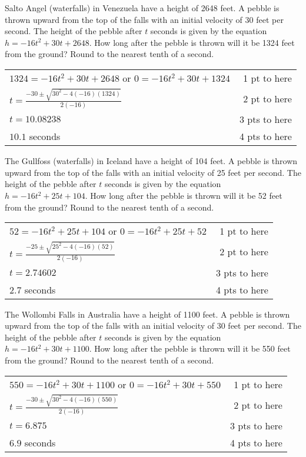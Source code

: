 {
	Salto Angel (waterfalls) in Venezuela have a height of 2648 feet. A pebble is thrown upward from the top of the falls with an initial velocity of 30 feet per second. The height of the pebble after $t$ seconds is given by the equation $h=-16t^2+30t+2648$. How long after the pebble is thrown will it be 1324 feet from the ground? Round to the nearest tenth of a second.
}
{
	\begin{tabular}{l r}
	$1324=-16t^2+30t+2648$ or $0=-16t^2+30t+1324$ & 1 pt to here\\
	$t=\frac{-30 \pm \sqrt{30^2-4(-16)(1324)}}{2(-16)}$ & 2 pt to here\\
	$t=10.08238$ &  3 pts to here\\
	$10.1$ seconds & 4 pts to here\\
	\end{tabular}
}

{
	The Gullfoss (waterfalls) in Iceland have a height of 104 feet. A pebble is thrown upward from the top of the falls with an initial velocity of 25 feet per second. The height of the pebble after $t$ seconds is given by the equation $h=-16t^2+25t+104$. How long after the pebble is thrown will it be 52 feet from the ground? Round to the nearest tenth of a second.
}
{
	\begin{tabular}{l r}
	$52=-16t^2+25t+104$ or $0=-16t^2+25t+52$ & 1 pt to here\\
	$t=\frac{-25 \pm \sqrt{25^2-4(-16)(52)}}{2(-16)}$ & 2 pt to here\\
	$t=2.74602$ &  3 pts to here\\
	$2.7$ seconds & 4 pts to here\\
	\end{tabular}
}

{
	The Wollombi Falls in Australia have a height of 1100 feet. A pebble is thrown upward from the top of the falls with an initial velocity of 30 feet per second. The height of the pebble after $t$ seconds is given by the equation $h=-16t^2+30t+1100$. How long after the pebble is thrown will it be 550 feet from the ground? Round to the nearest tenth of a second.
}
{
	\begin{tabular}{l r}
	$550=-16t^2+30t+1100$ or $0=-16t^2+30t+550$ & 1 pt to here\\
	$t=\frac{-30 \pm \sqrt{30^2-4(-16)(550)}}{2(-16)}$ & 2 pt to here\\
	$t=6.875$ &  3 pts to here\\
	$6.9$ seconds & 4 pts to here\\
	\end{tabular}
}

